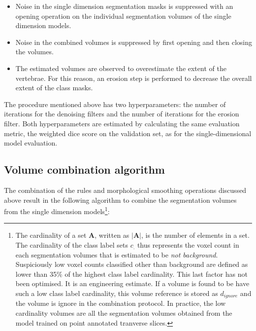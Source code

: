 \begin{itemize}
    \item Noise in the single dimension segmentation masks is suppressed with an opening operation on the individual segmentation volumes of the single dimension models.
    \item Noise in the combined volumes is suppressed by first opening and then closing the volumes.
    \item The estimated volumes are observed to overestimate the extent of the vertebrae. For this reason, an erosion step is performed to decrease the overall extent of the class masks.
\end{itemize}

The procedure mentioned above has two hyperparameters: the number of iterations for the denoising filters and the number of iterations for the erosion filter.
Both hyperparameters are estimated by calculating the same evaluation metric, the weighted dice score on the validation set, as for the single-dimensional model evaluation. 

\subsection{Volume combination algorithm}
The combination of the rules and morphological smoothing operations discussed above result in the following algorithm to combine the segmentation volumes from the single dimension models\footnote{
    The cardinality of a set $\mathbf{A}$, written as $|\mathbf{A}|$, is the number of elements in a set.
    The cardinality of the class label sets $c_.$ thus represents the voxel count in each segmentation volumes that is estimated to be \textit{not background}.
    Suspiciously low voxel counts classified other than background are defined as lower than 35\% of the highest class label cardinality.
    This last factor has not been optimised. It is an engineering estimate.
    If a volume is found to be have such a low class label cardinality, this volume reference is stored as $d_{ignore}$ and the volume is ignore in the combination protocol.
    In practice, the low cardinality volumes are all the segmentation volumes obtained from the model trained on point annotated tranverse slices.
}:

